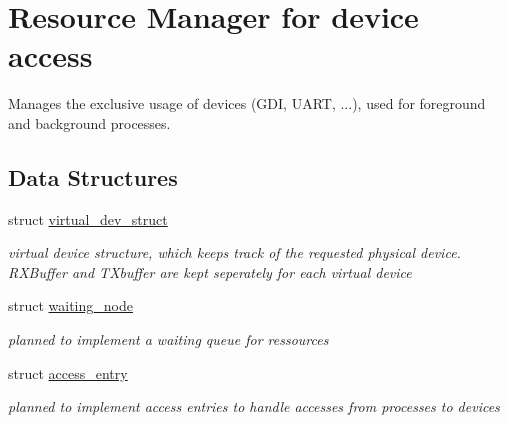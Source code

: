 \hypertarget{group___r_e_s_o_u_r_c_e___m}{
\section{Resource Manager for device access}
\label{group___r_e_s_o_u_r_c_e___m}
}
Manages the exclusive usage of devices (GDI, UART, ...), used for foreground and background processes.  


\subsection*{Data Structures}
\begin{CompactItemize}
\item 
struct \hyperlink{structvirtual__dev__struct}{virtual\_\-dev\_\-struct}
\begin{CompactList}\small\item\em virtual device structure, which keeps track of the requested physical device. RXBuffer and TXbuffer are kept seperately for each virtual device \item\end{CompactList}\item 
struct \hyperlink{structwaiting__node}{waiting\_\-node}
\begin{CompactList}\small\item\em planned to implement a waiting queue for ressources \item\end{CompactList}\item 
struct \hyperlink{structaccess__entry}{access\_\-entry}
\begin{CompactList}\small\item\em planned to implement access entries to handle accesses from processes to devices \item\end{CompactList}\end{CompactItemize}
